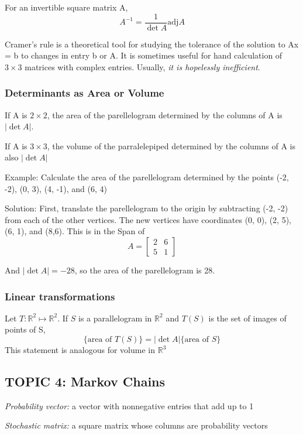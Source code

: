 \documentclass[12pt]{article} %
\newcommand{\R}{\mathbb{R}}
\begin{document}
For an invertible square matrix A, 
$$A^{-1} = \frac{1}{\det A} \text{adj} A$$

Cramer's rule is a theoretical tool for studying the tolerance of the solution to Ax = b to changes in entry b or A. It is sometimes useful for hand calculation of $3 \times 3$ matrices with complex entries. Usually, \emph{it is hopelessly inefficient}.

\subsubsection{Determinants as Area or Volume}
If A is $2 \times 2$, the area of the parellelogram determined by the columns of A is $|\det A|$.

If A is $3 \times 3$, the volume of the parralelepiped determined by the columns of A is also $|\det A|$

Example: Calculate the area of the parellelogram determined by the points (-2, -2), (0, 3), (4, -1), and (6, 4)

Solution:
First, translate the parellelogram to the origin by subtracting (-2, -2) from each of the other vertices.
The new vertices have coordinates (0, 0), (2, 5), (6, 1), and (8,6).
This is in the Span of 
$$A = \begin{bmatrix}
	2 & 6\\
	5 & 1
\end{bmatrix}$$

And $|\det A| = -28$, so the area of the parellelogram is 28.

\subsubsection{Linear transformations}
Let $T : \R^2 \mapsto \R^2$. If $S$ is a parallelogram in $\R^2$ and $T(S)$ is the set of images of points of S, 
$$\{\text{area of }T(S)\} = |\det A| \{\text{area of }S\}$$
This statement is analogous for volume in $\R^3$

\subsection{TOPIC 4: Markov Chains}
\emph{Probability vector:} a vector with nonnegative entries that add up to 1

\emph{Stochastic matrix:} a square matrix whose columns are probability vectors
\end{document}
